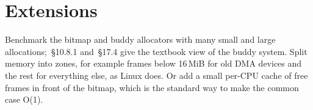 \documentclass[11pt,a4paper]{article}
\begin{document}
\section{Extensions}

Benchmark the bitmap and buddy allocators with many small and large allocations; \OSC\,\S10.8.1 and
\OSTEP\,\S17.4 give the textbook view of the buddy system. Split memory into zones, for example frames below 16\,MiB for old DMA devices and the rest for
everything else, as Linux does. Or add a small per-CPU cache of free frames in front of the bitmap, which is the
standard way to make the common case O(1).

\booklegend
\end{document}

